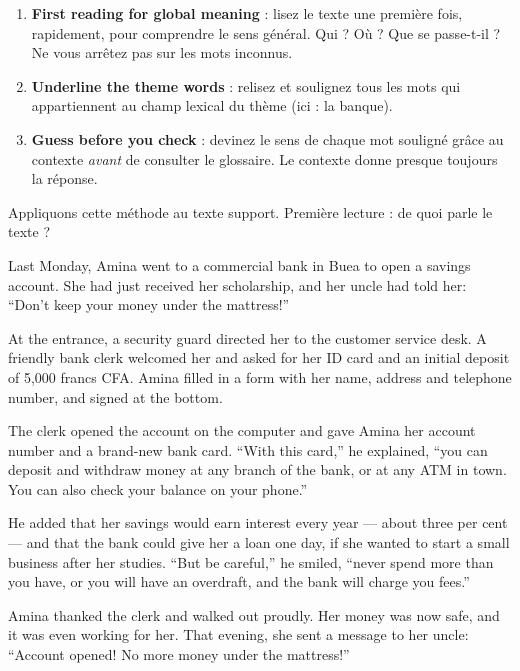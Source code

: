 \documentclass[11pt]{article}
\begin{document}
\begin{methode}
\begin{enumerate}
\item \textbf{First reading for global meaning} : lisez le texte une première fois, rapidement, pour comprendre le sens général. Qui ? Où ? Que se passe-t-il ? Ne vous arrêtez pas sur les mots inconnus.
\item \textbf{Underline the theme words} : relisez et soulignez tous les mots qui appartiennent au champ lexical du thème (ici : la banque).
\item \textbf{Guess before you check} : devinez le sens de chaque mot souligné grâce au contexte \emph{avant} de consulter le glossaire. Le contexte donne presque toujours la réponse.
\end{enumerate}
\end{methode}

Appliquons cette méthode au texte support. Première lecture : de quoi parle le texte ?

\begin{textebox}
Last Monday, Amina went to a commercial bank in Buea to open a savings account. She had just received her scholarship, and her uncle had told her: “Don't keep your money under the mattress!”

At the entrance, a security guard directed her to the customer service desk. A friendly bank clerk welcomed her and asked for her ID card and an initial deposit of 5,000 francs CFA. Amina filled in a form with her name, address and telephone number, and signed at the bottom.

The clerk opened the account on the computer and gave Amina her account number and a brand-new bank card. “With this card,” he explained, “you can deposit and withdraw money at any branch of the bank, or at any ATM in town. You can also check your balance on your phone.”

He added that her savings would earn interest every year — about three per cent — and that the bank could give her a loan one day, if she wanted to start a small business after her studies. “But be careful,” he smiled, “never spend more than you have, or you will have an overdraft, and the bank will charge you fees.”

Amina thanked the clerk and walked out proudly. Her money was now safe, and it was even working for her. That evening, she sent a message to her uncle: “Account opened! No more money under the mattress!”
\end{textebox}
\end{document}

